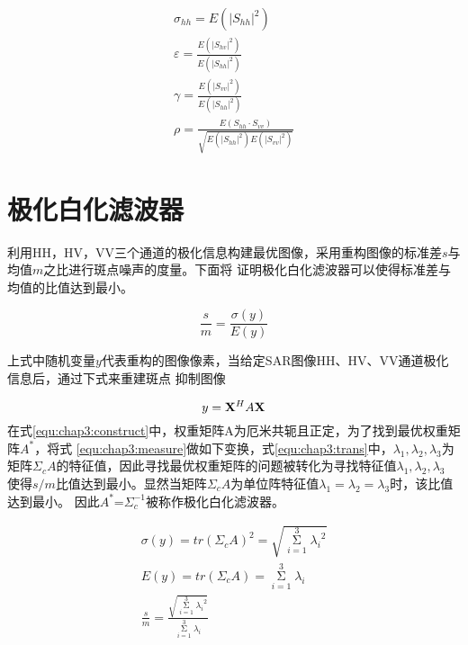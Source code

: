     \begin{equation}
        \begin{array}{l}
        {\sigma _{hh}} = E({\left| {S_{hh}} \right|^2})\\
        \varepsilon  = \frac{{E({{\left| {S_{hv}} \right|}^2})}}{{E({{\left| {S_{hh}} \right|}^2})}}\\
        \gamma  = \frac{{E({{\left| {S_{vv}} \right|}^2})}}{{E({{\left| {S_{hh}} \right|}^2})}}\\
        \rho  = \frac{{E(S_{hh} \cdot S_{vv})}}{{\sqrt {E({{\left| {S_{hh}} \right|}^2})E({{\left| {S_{vv}} \right|}^2})} }}
        \end{array}
    \end{equation}

\section{极化白化滤波器}
    利用HH，HV，VV三个通道的极化信息构建最优图像，采用重构图像的标准差$s$与均值$m$之比进行斑点噪声的度量。下面将
    证明极化白化滤波器可以使得标准差与均值的比值达到最小。

    \begin{equation}
        \label{equ:chap3:measure}
        \frac{s}{m} = \frac{{\sigma (y)}}{{E(y)}}
    \end{equation}

    上式中随机变量$y$代表重构的图像像素，当给定SAR图像HH、HV、VV通道极化信息后，通过下式来重建斑点
    抑制图像

    \begin{equation}
        \label{equ:chap3:construct}
        y = {{\bf{X}}^H}A{\bf{X}}
    \end{equation}
    在式\ref{equ:chap3:construct}中，权重矩阵A为厄米共轭且正定，为了找到最优权重矩阵$A^*$，将式
    \ref{equ:chap3:measure}做如下变换，式\ref{equ:chap3:trans}中，$\lambda_1, \lambda_2, \lambda_3$为
    矩阵${\Sigma _c}A$的特征值，因此寻找最优权重矩阵的问题被转化为寻找特征值$\lambda_1, \lambda_2, \lambda_3$
    使得$s/m$比值达到最小。显然当矩阵$\Sigma_cA$为单位阵特征值$\lambda_1=\lambda_2=\lambda_3$时，该比值达到最小。
    因此$A^*$=$\Sigma_c^{-1}$被称作极化白化滤波器。


    \begin{equation}
        \label{equ:chap3:trans}
        \begin{array}{*{20}{c}}
            {\sigma (y) = tr{{({\Sigma _c}A)}^2} = \sqrt {\mathop \Sigma \limits_{i = 1}^3 {\lambda _i}^2} }\\
            {E(y) = tr({\Sigma _c}A) = \mathop \Sigma \limits_{i = 1}^3 {\lambda _i}}\\
            {\frac{s}{m} = \frac{{\sqrt {\mathop \Sigma \limits_{i = 1}^3 {\lambda _i}^2} }}{{\mathop \Sigma \limits_{i = 1}^3 {\lambda _i}}}}
        \end{array}
    \end{equation}

